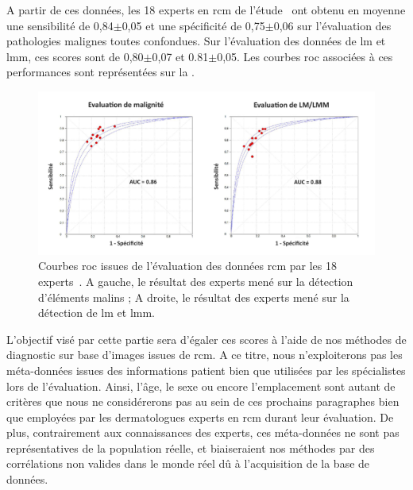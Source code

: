 A partir de ces données, les 18 experts en \gls{rcm} de l'étude~\cite{Cinotti2018} ont obtenu en moyenne une sensibilité de 0,84$\pm$0,05 et une spécificité de 0,75$\pm$0,06 sur l'évaluation des pathologies malignes toutes confondues. Sur l'évaluation des données de \gls{lm} et \gls{lmm}, ces scores sont de 0,80$\pm$0,07 et 0.81$\pm$0,05. Les courbes \gls{roc} associées à ces performances sont représentées sur la .\par

\begin{figure}[H]
    \begin{center}
        \includegraphics[width=\linewidth]{contents/ii_preamble_microscopy/resources/results_rcm_experts.pdf}
        \caption{Courbes \gls{roc} issues de l'évaluation des données \gls{rcm} par les 18 experts~\cite{Cinotti2018}. A gauche, le résultat des experts mené sur la détection d'éléments malins ; A droite, le résultat des experts mené sur la détection de \gls{lm} et \gls{lmm}.}
        \label{fig:results_rcm_experts}
    \end{center} 
\end{figure}\par

L'objectif visé par cette partie sera d'égaler ces scores à l'aide de nos méthodes de diagnostic sur base d'images issues de \gls{rcm}. A ce titre, nous n'exploiterons pas les méta-données issues des informations patient bien que utilisées par les spécialistes lors de l'évaluation. Ainsi, l'âge, le sexe ou encore l'emplacement sont autant de critères que nous ne considérerons pas au sein de ces prochains paragraphes bien que employées par les dermatologues experts en \gls{rcm} durant leur évaluation. De plus, contrairement aux connaissances des experts, ces méta-données ne sont pas représentatives de la population réelle, et biaiseraient nos méthodes par des corrélations non valides dans le monde réel dû à l'acquisition de la base de données.\par

